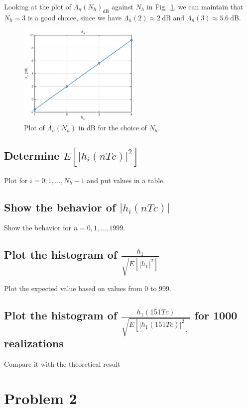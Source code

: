 \documentclass[10pt]{article}
\newcommand{\dB} {\mathrm{dB}}
\numberwithin{equation}{section}
\begin{document}
Looking at the plot of $\Lambda_n (N_h)_{\dB}$ against $N_h$ in Fig.~\ref{fig:p01_lambda_n}, we can maintain that $N_h = 3$ is a good choice, since we have $\Lambda_n(2) \approx 2~\dB$ and $\Lambda_n(3) \approx 5.6~\dB$.

\begin{figure}[ht]
	\centering
	\includegraphics[width=0.52\textwidth]{p01_lambda_n}
	\caption{Plot of $\Lambda_n (N_h)$ in dB for the choice of $N_h$.}
    \label{fig:p01_lambda_n}
\end{figure}

\subsection*{Determine $E[|h_i(nTc)|^2]$}
Plot for $i = 0, 1, \dots, N_h - 1$ and put values in a table.

\subsection*{Show the behavior of $|h_i(nTc)|$}
Show the behavior for $n = 0, 1, \dots, 1999$.

\subsection*{Plot the histogram of $\frac{h_1}{\sqrt{E[|h_1|^2]}}$}
Plot the expected value based on values from 0 to 999.

\subsection*{Plot the histogram of $\frac{h_1(151Tc)}{\sqrt{E[|h_1(151Tc)|^2]}}$ for 1000 realizations}
Compare it with the theoretical result

\section*{Problem 2}
\end{document}

